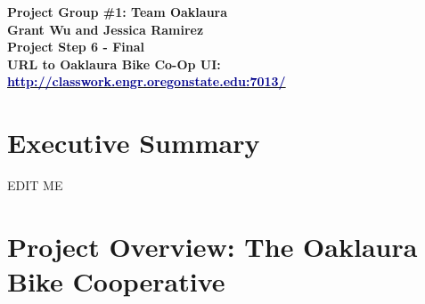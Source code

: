\documentclass{article}
\begin{document}
\begin{center}
\large\textcolor{primarycolor}{\textbf{Project Group \#1: Team Oaklaura}}\\[0.3cm]
\large\textbf{Grant Wu and Jessica Ramirez}\\[0.3cm]
\huge\textbf{Project Step 6 - Final}\\[0.5cm]

\large\textbf{URL to Oaklaura Bike Co-Op UI:}\\[0.5cm]
\large\href{http://classwork.engr.oregonstate.edu:7013/}{\textcolor{darkblue}{\textbf{http://classwork.engr.oregonstate.edu:7013/}}}\\[1.25cm]
\end{center}
\section{Executive Summary}
\begin{tcolorbox}[colback=secondarycolor, colframe=primarycolor, title=\textbf{Reflection on Major Changes Throughout Project}]
EDIT ME
\end{tcolorbox}

\section{Project Overview: The Oaklaura Bike Cooperative}
\end{document}
